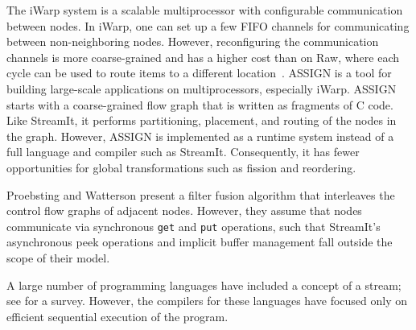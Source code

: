 The iWarp system \cite{iwarp} is a scalable multiprocessor with
configurable communication between nodes.  In iWarp, one can set up a
few FIFO channels for communicating between non-neighboring
nodes. However, reconfiguring the communication channels is more
coarse-grained and has a higher cost than on Raw, where each cycle can
be used to route items to a different location~\cite{Scalar Operand
Network paper}.  ASSIGN \cite{assign} is a tool for building
large-scale applications on multiprocessors, especially iWarp.  ASSIGN
starts with a coarse-grained flow graph that is written as fragments
of C code.  Like StreamIt, it performs partitioning, placement, and
routing of the nodes in the graph.  However, ASSIGN is implemented as
a runtime system instead of a full language and compiler such as
StreamIt.  Consequently, it has fewer opportunities for global
transformations such as fission and reordering.

Proebsting and Watterson \cite{pro96} present a filter fusion
algorithm that interleaves the control flow graphs of adjacent nodes.
However, they assume that nodes communicate via synchronous {\tt get}
and {\tt put} operations, such that StreamIt's asynchronous peek
operations and implicit buffer management fall outside the scope of
their model.  

A large number of programming languages have included a concept of a
stream; see \cite{survey97} for a survey. However, the compilers for
these languages have focused only on efficient sequential execution of
the program.
